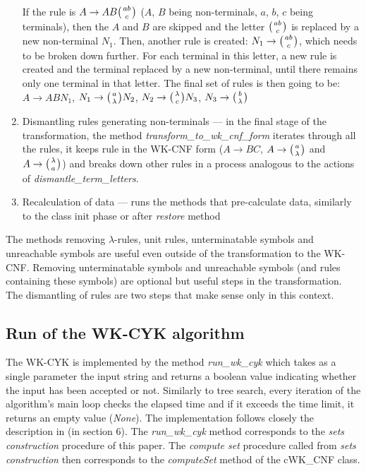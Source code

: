 \begin{enumerate}
{  If the rule is $A \rightarrow A B \wkpair{ab}{c}$ ($A$, $B$ being non-terminals, $a$, $b$, $c$ being terminals), then the $A$ and $B$ are skipped and the letter $\wkpair{ab}{c}$ is replaced by a new non-terminal $N_1$. Then, another rule is created: $N_1 \rightarrow \wkpair{ab}{c}$, which needs to be broken down further. For each terminal in this letter, a new rule is created and the terminal replaced by a new non-terminal, until there remains only one terminal in that letter. The final set of rules is then going to be: $A \rightarrow A B N_1$, $N_1 \rightarrow \wkpair{a}{\lambda} N_2$, $N_2 \rightarrow \wkpair{\lambda}{c} N_3$, $N_3 \rightarrow \wkpair{b}{\lambda}$}

  \item{Dismantling rules generating non-terminals --- in the final stage of the transformation, the method \textit{transform\_to\_wk\_cnf\_form} iterates through all the rules, it keeps rule in the WK-CNF form ($A \rightarrow BC$, $A \rightarrow \wkpair{a}{\lambda}$ and $A \rightarrow \wkpair{\lambda}{a}$) and breaks down other rules in a process analogous to the actions of \textit{dismantle\_term\_letters}}.

  \item{Recalculation of data --- runs the methods that pre-calculate data, similarly to the class init phase or after \textit{restore} method}
\end{enumerate}

The methods removing $\lambda$-rules, unit rules, unterminatable symbols and unreachable symbols are useful even outside of the transformation to the WK-CNF. Removing unterminatable symbols and unreachable symbols (and rules containing these symbols) are optional but useful steps in the transformation. The dismantling of rules are two steps that make sense only in this context.


\subsection{Run of the WK-CYK algorithm}
The WK-CYK is implemented by the method \textit{run\_wk\_cyk} which takes as a single parameter the input string and returns a boolean value indicating whether the input has been accepted or not. Similarly to tree search, every iteration of the algorithm's main loop checks the elapsed time and if it exceeds the time limit, it returns an empty value (\textit{None}). The implementation follows closely the description in \cite{WK_CYK} (in section 6). The \textit{run\_wk\_cyk} method corresponds to the \textit{sets construction} procedure of this paper. The \textit{compute set} procedure called from \textit{sets construction} then corresponds to the \textit{computeSet} method of the cWK\_CNF class.


